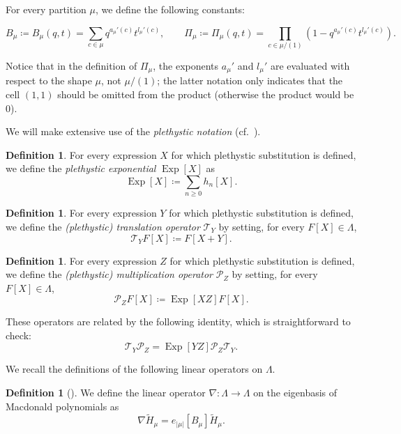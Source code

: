 \documentclass[reqno]{amsart}
\theoremstyle{plain}
\theoremstyle{definition}
\newtheorem{definition}[theorem]{Definition}
\theoremstyle{remark}
\DeclareMathOperator{\Exp}{Exp}
\newcommand{\Ht}{\widetilde{H}}
\newcommand{\<}{\langle}
\renewcommand{\>}{\rangle}
\begin{document}
For every partition $\mu$, we define the following constants:

\[ B_{\mu} \coloneqq B_{\mu}(q,t) = \sum_{c \in \mu} q^{a_{\mu}'(c)} t^{l_{\mu}'(c)}, \qquad
    \Pi_{\mu} \coloneqq \Pi_{\mu}(q,t) = \prod_{c \in \mu / (1)} (1-q^{a_{\mu}'(c)} t^{l_{\mu}'(c)}). \]

Notice that in the definition of $\Pi_\mu$, the exponents $a_{\mu}'$ and $l_{\mu}'$ are evaluated with respect to the shape $\mu$, not $\mu / (1)$; the latter notation only indicates that the cell $(1,1)$ should be omitted from the product (otherwise the product would be $0$).

We will make extensive use of the \emph{plethystic notation} (cf.\ \cite[Chapter~1]{Haglund2008Book}).

\begin{definition}
    For every expression $X$ for which plethystic substitution is defined, we define the \emph{plethystic exponential} $\Exp[X]$  as
    \[\Exp[X] \coloneqq \sum_{n\geq 0} h_n[X].\]
\end{definition}

\begin{definition}
    For every expression $Y$ for which plethystic substitution is defined, we define the \emph{(plethystic) translation operator} $\mathcal{T}_Y$ by setting, for every $F[X] \in \Lambda$,
    \[ \mathcal{T}_Y F[X] \coloneqq F[X+Y]. \]
\end{definition}

\begin{definition}
    For every expression $Z$ for which plethystic substitution is defined, we define the \emph{(plethystic) multiplication operator} $\mathcal{P}_Z$ by setting, for every $F[X]\in \Lambda$,
    \[ \mathcal{P}_Z F[X] \coloneqq \Exp[XZ] F[X]. \]
\end{definition}

These operators are related by the following identity, which is straightforward to check:
\begin{equation}
    \label{eq:TPExp}
    \mathcal{T}_Y \mathcal{P}_Z= \Exp[YZ] \mathcal{P}_Z \mathcal{T}_Y.
\end{equation}

We recall the definitions of the following linear operators on $\Lambda$.

\begin{definition}[{\cite[Equation~(3.11)]{BergeronGarsia1999ScienceFiction}}]
    \label{def:nabla}
    We define the linear operator $\nabla \colon \Lambda \rightarrow \Lambda$ on the eigenbasis of Macdonald polynomials as \[ \nabla \Ht_\mu = e_{\lvert \mu \rvert}[B_\mu] \Ht_\mu. \]
\end{definition}
\end{document}
